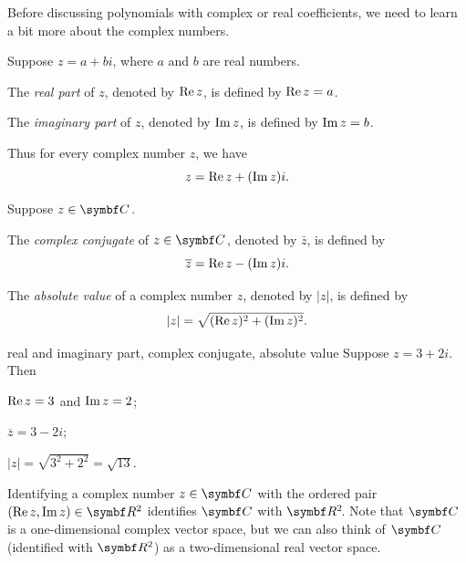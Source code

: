 \newpage


Before discussing polynomials with complex or real coefficients, we need to learn a bit
more about the complex numbers.

{Suppose $z = a + bi$, where $a$ and $b$ are real numbers.
\begin{Itemize}
\item
The \emph{real part} of $z$, denoted by $\operatorname{Re} z$, is defined by $\operatorname{Re} z = a$.
\item
The \emph{imaginary part} of $z$, denoted by $\operatorname{Im} z$, is defined by $\operatorname{Im} z = b$.
\end{Itemize}}


Thus for  every complex number $z$, we have
\[
z = \operatorname{Re} z +  (\operatorname{Im} z)i.
\]

{Suppose $z \in \C{}$.
\begin{Itemize}
\item
The \emph{complex conjugate} of
$z \in \C{}$, denoted by $\bar{z}$, is defined by
\[
\overline{z} = \operatorname{Re} z - (\operatorname{Im} z)i.
\]
\item
The \emph{absolute value} of a complex number
$z$,  denoted by $|z|$, is defined by
\[
|z| = \sqrt{(\operatorname{Re} z)^2 + (\operatorname{Im} z)^2}.
\]
\end{Itemize}}

\begin{example}{real and imaginary part, complex conjugate, absolute value}
Suppose $z = 3 + 2i$. Then
\begin{Itemize}
\item
$\operatorname{Re} z = 3$ and $\operatorname{Im} z = 2$;
\item
$\overline{z} = 3 - 2i$;
\item
$ |z| = \sqrt{3^2 + 2^2} = \sqrt{13}$.
\end{Itemize}
\exampleitemend
\end{example}

Identifying a complex number $z \in \C{}$ with the ordered pair $(\re z, \im z) \in \R2$ identifies $\C{}$ with $\RR2$. Note that $\C{}$ is a one-dimensional complex vector space, but we can also think of $\C{}$ (identified with $\R2$) as a two-dimensional real vector space.

